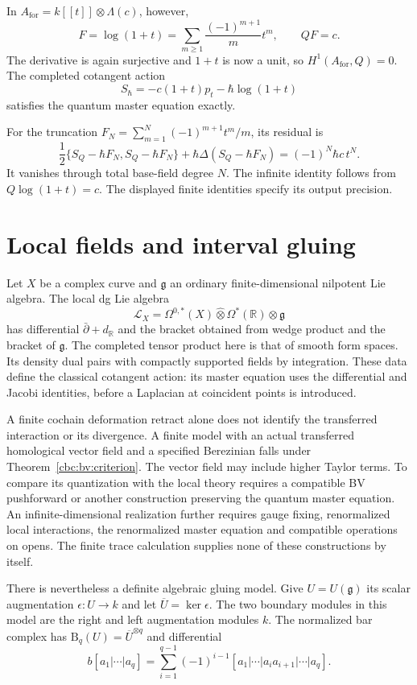 In $A_{\mathrm{for}}=k[[t]]\otimes\Lambda(c)$, however,
\[
 F=\log(1+t)=\sum_{m\ge1}\frac{(-1)^{m+1}}m t^m,
 \qquad QF=c .
\]
The derivative is again surjective and $1+t$ is now a unit, so
$H^1(A_{\mathrm{for}},Q)=0$.
The completed cotangent action
\[
 S_\hbar=-c(1+t)p_t-\hbar\log(1+t)
\]
satisfies the quantum master equation exactly.

For the truncation $F_N=\sum_{m=1}^N(-1)^{m+1}t^m/m$, its residual is
\[
 \frac12\{S_Q-\hbar F_N,S_Q-\hbar F_N\}
       +\hbar\Delta(S_Q-\hbar F_N)
 =(-1)^N\hbar c\,t^N .
\]
It vanishes through total base-field degree $N$.
The infinite identity follows from $Q\log(1+t)=c$.  The displayed
finite identities specify its output precision.

\section{Local fields and interval gluing}
Let $X$ be a complex curve and $\mathfrak g$ an ordinary
finite-dimensional nilpotent Lie algebra.  The local dg Lie algebra
\[
 \mathcal L_X
 =\Omega^{0,*}(X)\widehat\otimes\Omega^*(\mathbb R)\otimes\mathfrak g
\]
has differential $\bar\partial+d_{\mathbb R}$ and the bracket obtained
from wedge product and the bracket of $\mathfrak g$.
The completed tensor product here is that of smooth form spaces.
Its density dual pairs with compactly supported fields by integration.
These data define the classical cotangent action: its master equation
uses the differential and Jacobi identities, before a Laplacian at
coincident points is introduced.

A finite cochain deformation retract alone does not identify the
transferred interaction or its divergence.  A finite model with an
actual transferred homological vector field and a specified
Berezinian falls under Theorem~\ref{cbc:bv:criterion}.  The vector field
may include higher Taylor terms.
To compare its quantization with the local theory requires a
compatible BV pushforward or another construction preserving the
quantum master equation.
An infinite-dimensional realization further requires gauge fixing,
renormalized local interactions, the renormalized master equation and
compatible operations on opens.  The finite trace calculation
supplies none of these constructions by itself.

There is nevertheless a definite algebraic gluing model.
Give $U=U(\mathfrak g)$ its scalar augmentation
$\epsilon:U\to k$ and let $\overline U=\ker\epsilon$.
The two boundary modules in this model are the right and left
augmentation modules $k$.
The normalized bar complex has
$\mathrm B_q(U)=\overline U^{\otimes q}$ and differential
\[
 b[a_1|\cdots|a_q]
 =\sum_{i=1}^{q-1}(-1)^{i-1}
       [a_1|\cdots|a_ia_{i+1}|\cdots|a_q].
\]

